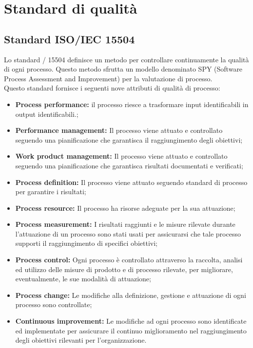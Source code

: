 \documentclass{scalatekids-article}
\begin{document}
\section{Standard di qualità}
\subsection{Standard ISO/IEC 15504}
\label{sec:ISO/IEC15504}
Lo standard / 15504 definisce un metodo per controllare continuamente la qualità di ogni processo. Questo metodo sfrutta un modello denominato SPY (Software Process Assessment and Improvement) per la valutazione di processo.\\
Questo standard fornisce i seguenti nove attributi di qualità di processo:
\begin{itemize}
  \item{\textbf{Process performance:} il processo riesce a trasformare input identificabili in output identificabili.;}
  \item{\textbf{Performance management:} Il processo viene attuato e controllato seguendo una pianificazione che garantisca il raggiungimento degli obiettivi;}
  \item{\textbf{Work product management:} Il processo viene attuato e controllato seguendo una pianificazione che garantisca risultati documentati e verificati;}
  \item{\textbf{Process definition:} Il processo viene attuato seguendo standard di processo per garantire i risultati;}
  \item{\textbf{Process resource:} Il processo ha risorse adeguate per la sua attuazione;}
  \item{\textbf{Process measurement:} I risultati raggiunti e le misure rilevate durante l'attuazione di un processo sono stati usati per assicurarsi che tale processo supporti il raggiungimento di specifici obiettivi;}
  \item{\textbf{Process control:} Ogni processo è controllato attraverso la raccolta, analisi ed utilizzo delle misure di prodotto e di processo rilevate, per migliorare, eventualmente, le sue modalità di attuazione;}
  \item{\textbf{Process change:} Le modifiche alla definizione, gestione e attuazione di ogni processo sono controllate;}
  \item{\textbf{Continuous improvement:} Le modifiche ad ogni processo sono identificate ed implementate per assicurare il continuo miglioramento nel raggiungimento degli obiettivi rilevanti per l'organizzazione.}
\end{itemize}
\end{document}
